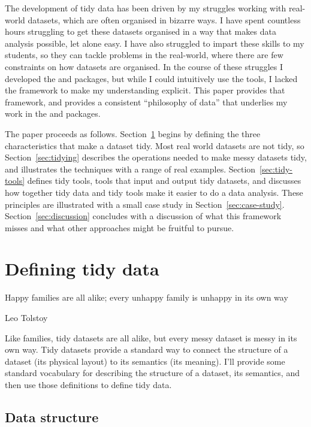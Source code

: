 \documentclass[article]{jss}
\begin{document}
The development of tidy data has been driven by my struggles working with real-world datasets, which are often organised in bizarre ways. I have spent countless hours struggling to get these datasets organised in a way that makes data analysis possible, let alone easy. I have also struggled to impart these skills to my students, so they can tackle problems in the real-world, where there are few constraints on how datasets are organised. In the course of these struggles I developed the  and  \citep{wickham:2007b}  packages, but while I could intuitively use the tools, I lacked the framework to make my understanding explicit. This paper provides that framework, and provides a consistent ``philosophy of data'' that underlies my work in the  \citep{me:plyr} and  \citep{me:ggplot2} packages.

The paper proceeds as follows. Section~\ref{sec:defining} begins by defining the three characteristics that make a dataset tidy. Most real world datasets are not tidy, so Section~\ref{sec:tidying} describes the operations needed to make messy datasets tidy, and illustrates the techniques with a range of real examples. Section~\ref{sec:tidy-tools} defines tidy tools, tools that input and output tidy datasets, and discusses how together tidy data and tidy tools make it easier to do a data analysis. These principles are illustrated with a small case study in Section~\ref{sec:case-study}. Section~\ref{sec:discussion} concludes with a discussion of what this framework misses and what other approaches might be fruitful to pursue.

\section{Defining tidy data}
\label{sec:defining}

\epigraph{Happy families are all alike; every unhappy family is unhappy in its own way}{Leo Tolstoy}

Like families, tidy datasets are all alike, but every messy dataset is messy in its own way. Tidy datasets provide a standard way to connect the structure of a dataset (its physical layout) to its semantics (its meaning). I'll provide some standard vocabulary for describing the structure of a dataset, its semantics, and then use those definitions to define tidy data.

\subsection{Data structure}
\end{document}
